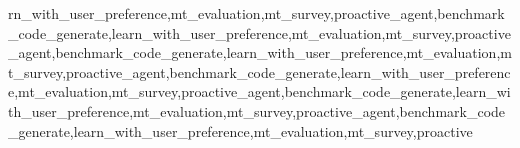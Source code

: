 rn_with_user_preference,mt_evaluation,mt_survey,proactive_agent,benchmark_code_generate,learn_with_user_preference,mt_evaluation,mt_survey,proactive_agent,benchmark_code_generate,learn_with_user_preference,mt_evaluation,mt_survey,proactive_agent,benchmark_code_generate,learn_with_user_preference,mt_evaluation,mt_survey,proactive_agent,benchmark_code_generate,learn_with_user_preference,mt_evaluation,mt_survey,proactive_agent,benchmark_code_generate,learn_with_user_preference,mt_evaluation,mt_survey,proactive
